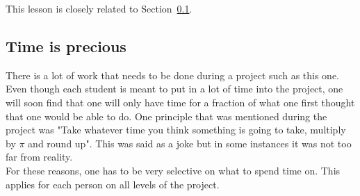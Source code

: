 This lesson is closely related to Section~\ref{sec:time}.

\subsection{Time is precious}\label{sec:time}
There is a lot of work that needs to be done during a project such as this one. Even though each student is meant to put in a lot of time into the project, one will soon find that one will only have time for a fraction of what one first thought that one would be able to do. One principle that was mentioned during the project was "Take whatever time you think something is going to take, multiply by $\pi$ and round up". This was said as a joke but in some instances it was not too far from reality. \\
For these reasons, one has to be very selective on what to spend time on. This applies for each person on all levels of the project.


